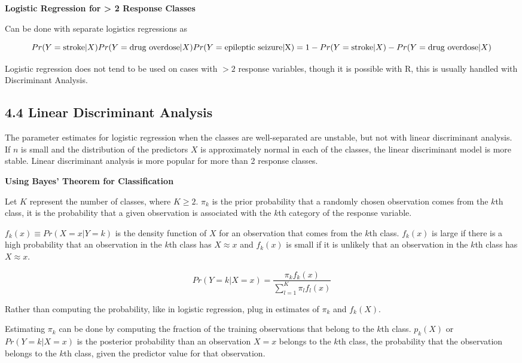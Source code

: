 \documentclass[
]{article}
\begin{document}
\textbf{Logistic Regression for \textgreater{} 2 Response Classes}

Can be done with separate logistics regressions as

\[Pr(Y=\text{stroke}|X)\\
Pr(Y=\text{drug overdose}|X)\\
Pr(Y=\text{epileptic seizure|X}) = 1 - Pr(Y=\text{stroke}|X) - Pr(Y=\text{drug overdose}|X)\]

Logistic regression does not tend to be used on cases with \(> 2\)
response variables, though it is possible with R, this is usually
handled with Discriminant Analysis.

\hypertarget{header-n32}{%
\subsection{4.4 Linear Discriminant Analysis}\label{header-n32}}

The parameter estimates for logistic regression when the classes are
well-separated are unstable, but not with linear discriminant analysis.
If \(n\) is small and the distribution of the predictors \(X\) is
approximately normal in each of the classes, the linear discriminant
model is more stable. Linear discriminant analysis is more popular for
more than 2 response classes.

\textbf{Using Bayes' Theorem for Classification}

Let \(K\) represent the number of classes, where \(K\ge2\). \(\pi_k\) is
the prior probability that a randomly chosen observation comes from the
\(k\)th class, it is the probability that a given observation is
associated with the \(k\)th category of the response variable.

\(f_k(x) \equiv Pr(X=x|Y=k)\) is the density function of \(X\) for an
observation that comes from the \(k\)th class. \(f_k(x)\) is large if
there is a high probability that an observation in the \(k\)th class has
\(X \approx x\) and \(f_k(x)\) is small if it is unlikely that an
observation in the \(k\)th class has \(X \approx x\).

\[Pr(Y=k|X=x)= \frac{\pi_kf_k(x)}{\sum^K_{l=1}\pi_lf_l(x)}\]

Rather than computing the probability, like in logistic regression, plug
in estimates of \(\pi_k\) and \(f_k(X)\).

Estimating \(\pi_k\) can be done by computing the fraction of the
training observations that belong to the \(k\)th class. \(p_k(X)\) or
\(Pr(Y=k|X=x)\) is the posterior probability than an observation \(X=x\)
belongs to the \(k\)th class, the probability that the observation
belongs to the \(k\)th class, given the predictor value for that
observation.
\end{document}
